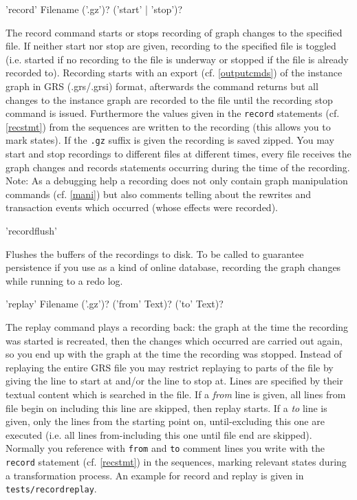 \begin{rail}
  'record' Filename ('.gz')? ('start' | 'stop')?
\end{rail}
The record command starts or stops recording of graph changes to the specified file. If neither start nor stop are given, recording to the specified file is toggled (i.e. started if no recording to the file is underway or stopped if the file is already recorded to).
Recording starts with an export (cf. \ref{outputcmds}) of the instance graph in GRS (.grs/.grsi) format, afterwards the command returns but all changes to the instance graph are recorded to the file until the recording stop command is issued.
Furthermore the values given in the \texttt{record} statements (cf. \ref{recstmt}) from the sequences are written to the recording (this allows you to mark states).
If the \texttt{.gz} suffix is given the recording is saved zipped.
You may start and stop recordings to different files at different times, every file receives the graph changes and records statements occurring during the time of the recording.
Note: As a debugging help a recording does not only contain graph manipulation commands (cf. \ref{mani}) but also comments telling about the rewrites and transaction events which occurred (whose effects were recorded).

\begin{rail}
  'recordflush'
\end{rail}
Flushes the buffers of the recordings to disk. 
To be called to guarantee persistence if you use \GrG{} as a kind of online database, recording the graph changes while running to a redo log.

\begin{rail}
  'replay' Filename ('.gz')? ('from' Text)? ('to' Text)?
\end{rail}
The replay command plays a recording back: the graph at the time the recording was started is recreated, then the changes which occurred are carried out again, so you end up with the graph at the time the recording was stopped. Instead of replaying the entire GRS file you may restrict replaying to parts of the file by giving the line to start at and/or the line to stop at. Lines are specified by their textual content which is searched in the file.
If a \emph{from} line is given, all lines from file begin on including this line are skipped, then replay starts. If a \emph{to} line is given, only the lines from the starting point on, until-excluding this one are executed (i.e. all lines from-including this one until file end are skipped).
Normally you reference with \texttt{from} and \texttt{to} comment lines you write with the \texttt{record} statement (cf. \ref{recstmt}) in the sequences, marking relevant states during a transformation process.
An example for record and replay is given in \texttt{tests/recordreplay}.
